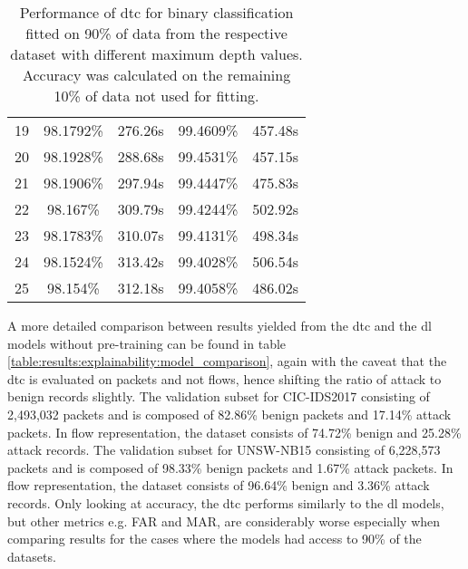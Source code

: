 \begin{table}[!h]
\begin{tabular}{c|cc|cc}
		19         & 98.1792\%     & 276.26s          & 99.4609\%    & 457.48s        \\
		20         & 98.1928\%     & 288.68s          & 99.4531\%    & 457.15s        \\
		21         & 98.1906\%     & 297.94s          & 99.4447\%    & 475.83s        \\
		22         & 98.167\%      & 309.79s          & 99.4244\%    & 502.92s        \\
		23         & 98.1783\%     & 310.07s          & 99.4131\%    & 498.34s        \\
		24         & 98.1524\%     & 313.42s          & 99.4028\%    & 506.54s        \\
		25         & 98.154\%      & 312.18s          & 99.4058\%    & 486.02s       
	\end{tabular}
	\caption{Performance of \gls{dtc} for binary classification fitted on 90\% of data from the respective dataset with different maximum depth values. Accuracy was calculated on the remaining 10\% of data not used for fitting.}
	\label{fig:results:dtc:depth_analysis}
\end{table}

A more detailed comparison between results yielded from the \gls{dtc} and the \gls{dl} models without pre-training can be found in table \ref{table:results:explainability:model_comparison}, again with the caveat that the \gls{dtc} is evaluated on packets and not flows, hence shifting the ratio of attack to benign records slightly. The validation subset for CIC-IDS2017 consisting of 2,493,032 packets and is composed of 82.86\% benign packets and 17.14\% attack packets. In flow representation, the dataset consists of
74.72\% benign and 25.28\% attack records. The validation subset for UNSW-NB15 consisting of 6,228,573 packets and is composed of 98.33\% benign packets and 1.67\% attack packets. In flow representation, the dataset consists of 
96.64\% benign and 3.36\% attack records. Only looking at accuracy, the \gls{dtc} performs similarly to the \gls{dl} models, but other metrics e.g. FAR and MAR, are considerably worse especially when comparing results for the cases where the models had access to 90\% of the datasets. 

